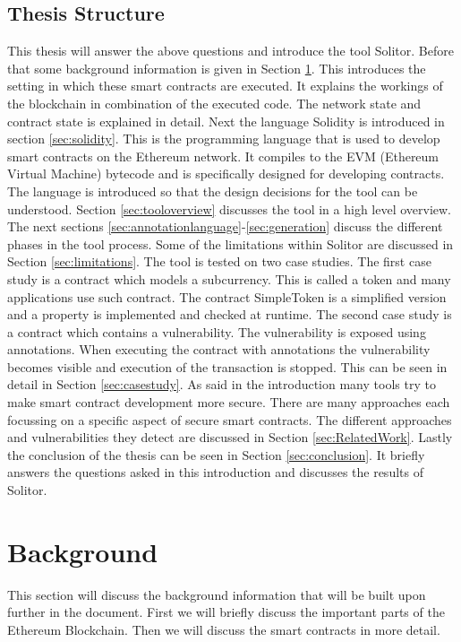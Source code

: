 \documentclass[a4paper]{article}
\begin{document}
\subsection{Thesis Structure}
This thesis will answer the above questions and introduce the tool Solitor. Before that some background information is given in Section \ref{sec:background}. This introduces the setting in which these smart contracts are executed. It explains the workings of the blockchain in combination of the executed code. The network state and contract state is explained in detail. Next the language Solidity is introduced in section \ref{sec:solidity}. This is the programming language that is used to develop smart contracts on the Ethereum network. It compiles to the EVM (Ethereum Virtual Machine) bytecode and is specifically designed for developing contracts. The language is introduced so that the design decisions for the tool can be understood. Section \ref{sec:tooloverview} discusses the tool in a high level overview. The next sections \ref{sec:annotationlanguage}-\ref{sec:generation} discuss the different phases in the tool process. Some of the limitations within Solitor are discussed in Section \ref{sec:limitations}. The tool is tested on two case studies. The first case study is a contract which models a subcurrency. This is called a token and many applications use such contract. The contract SimpleToken is a simplified version and a property is implemented and checked at runtime. The second case study is a contract which contains a vulnerability. The vulnerability is exposed using annotations. When executing the contract with annotations the vulnerability becomes visible and execution of the transaction is stopped. This can be seen in detail in Section \ref{sec:casestudy}. As said in the introduction many tools try to make smart contract development more secure. There are many approaches each focussing on a specific aspect of secure smart contracts. The different approaches and vulnerabilities they detect are discussed in Section \ref{sec:RelatedWork}. Lastly the conclusion of the thesis can be seen in Section \ref{sec:conclusion}. It briefly answers the questions asked in this introduction and discusses the results of Solitor. 

\newpage
\section{Background}
\label{sec:background}
This section will discuss the background information that will be built upon further in the document. First we will briefly discuss the important parts of the Ethereum Blockchain. Then we will discuss the smart contracts in more detail.
\end{document}

